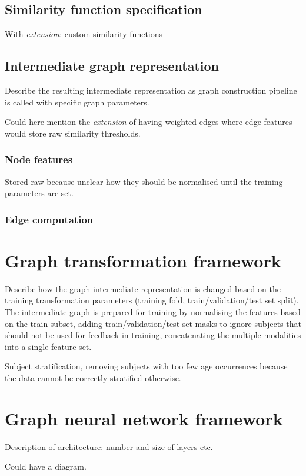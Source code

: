 \subsection{Similarity function specification}
With \textit{extension}: custom similarity functions


\subsection{Intermediate graph representation}
Describe the resulting intermediate representation as graph construction pipeline is called with specific graph parameters.

Could here mention the \textit{extension} of having weighted edges where edge features would store raw similarity thresholds.

\subsubsection{Node features}
Stored raw because unclear how they should be normalised until the training parameters are set.

\subsubsection{Edge computation}



\section{Graph transformation framework}
Describe how the graph intermediate representation is changed based on the training transformation parameters (training fold, train/validation/test set split). The intermediate graph is prepared for training by normalising the features based on the train subset, adding train/validation/test set masks to ignore subjects that should not be used for feedback in training, concatenating the multiple modalities into a single feature set.

Subject stratification, removing subjects with too few age occurrences because the data cannot be correctly stratified otherwise.


\section{Graph neural network framework}
Description of architecture: number and size of layers etc.

Could have a diagram.

